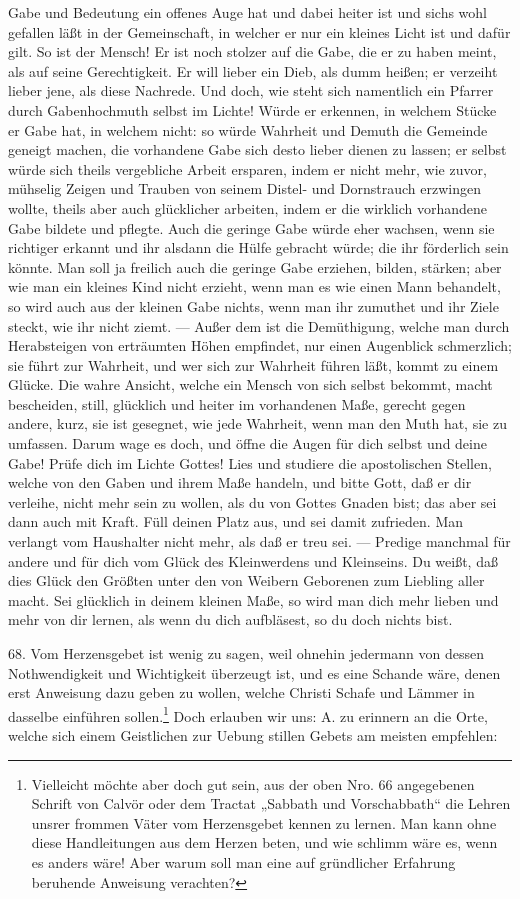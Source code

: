 Gabe und Bedeutung ein offenes Auge hat und dabei heiter ist und sichs wohl gefallen läßt in der Gemeinschaft, in welcher er nur ein kleines Licht ist und dafür gilt. So ist der Mensch! Er ist noch stolzer auf die Gabe, die er zu haben meint, als auf seine Gerechtigkeit. Er will lieber ein Dieb, als dumm heißen; er verzeiht lieber jene, als diese Nachrede. Und doch, wie steht sich namentlich ein Pfarrer durch Gabenhochmuth selbst im Lichte! Würde er erkennen, in welchem Stücke er Gabe hat, in welchem nicht: so würde Wahrheit und Demuth die Gemeinde geneigt machen, die vorhandene Gabe sich desto lieber dienen zu lassen; er selbst würde sich theils vergebliche Arbeit ersparen, indem er nicht mehr, wie zuvor, mühselig Zeigen und Trauben von seinem Distel- und Dornstrauch erzwingen wollte, theils aber auch glücklicher arbeiten, indem er die wirklich vorhandene Gabe bildete und pflegte. Auch die geringe Gabe würde eher wachsen, wenn sie richtiger erkannt und ihr alsdann die Hülfe gebracht würde; die ihr förderlich sein könnte. Man soll ja freilich auch die geringe Gabe erziehen, bilden, stärken; aber wie man ein kleines Kind nicht erzieht, wenn man es wie einen Mann behandelt, so wird auch aus der kleinen Gabe nichts, wenn man ihr zumuthet und ihr Ziele steckt, wie ihr nicht ziemt. — Außer dem ist die Demüthigung, welche man durch Herabsteigen von erträumten Höhen empfindet, nur einen Augenblick schmerzlich; sie führt zur Wahrheit, und wer sich zur Wahrheit führen läßt, kommt zu einem Glücke. Die wahre Ansicht, welche ein Mensch von sich selbst bekommt, macht bescheiden, still, glücklich und heiter
im vorhandenen Maße, gerecht gegen andere, kurz, sie ist gesegnet, wie jede Wahrheit, wenn man den Muth hat, sie zu umfassen. Darum wage es doch, und öffne die Augen für dich selbst und deine Gabe! Prüfe dich im Lichte Gottes! Lies und studiere die apostolischen Stellen, welche von den Gaben und ihrem Maße handeln, und bitte Gott, daß er dir verleihe, nicht mehr sein zu wollen, als du von Gottes Gnaden bist; das aber sei dann auch mit Kraft. Füll deinen Platz aus, und sei damit zufrieden. Man verlangt vom Haushalter nicht mehr, als daß er treu sei. — Predige manchmal für andere und für dich vom Glück des Kleinwerdens und Kleinseins. Du weißt, daß dies Glück den Größten unter den von Weibern Geborenen zum Liebling aller macht. Sei glücklich in deinem kleinen Maße, so wird man dich mehr lieben und mehr von dir lernen, als wenn du dich aufbläsest, so du doch nichts bist.

68. Vom Herzensgebet ist wenig zu sagen, weil ohnehin jedermann von dessen Nothwendigkeit und Wichtigkeit überzeugt ist, und es eine Schande wäre, denen erst Anweisung dazu geben zu wollen, welche Christi Schafe und Lämmer in dasselbe einführen sollen.\footnote{Vielleicht möchte aber doch gut sein, aus der oben Nro. 66 angegebenen Schrift von Calvör oder dem Tractat „Sabbath und Vorschabbath“ die Lehren unsrer frommen Väter vom Herzensgebet kennen zu lernen. Man kann ohne diese Handleitungen aus dem Herzen beten, und wie schlimm wäre es, wenn es anders wäre! Aber warum soll man eine auf gründlicher Erfahrung beruhende Anweisung verachten?} Doch erlauben wir uns:
A. zu erinnern an die Orte, welche sich einem Geistlichen zur Uebung stillen Gebets am meisten empfehlen:

